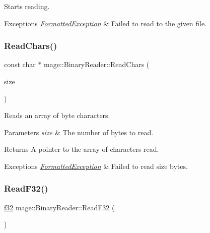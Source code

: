 Starts reading.


\begin{DoxyExceptions}{Exceptions}
{\em \hyperlink{structmage_1_1_formatted_exception}{Formatted\+Exception}} & Failed to read to the given file. \\
\hline
\end{DoxyExceptions}
\hypertarget{classmage_1_1_binary_reader_af1e0e4ab815e23c72ab65fd7c0748d3f}{}\label{classmage_1_1_binary_reader_af1e0e4ab815e23c72ab65fd7c0748d3f} 
\subsubsection{\texorpdfstring{Read\+Chars()}{ReadChars()}}
{\footnotesize\ttfamily const char $\ast$ mage\+::\+Binary\+Reader\+::\+Read\+Chars (\begin{DoxyParamCaption}\item[{size\+\_\+t}]{size }\end{DoxyParamCaption})\hspace{0.3cm}{\ttfamily [protected]}}

Reads an array of byte characters.


\begin{DoxyParams}{Parameters}
{\em size} & The number of bytes to read. \\
\hline
\end{DoxyParams}
\begin{DoxyReturn}{Returns}
A pointer to the array of characters read. 
\end{DoxyReturn}

\begin{DoxyExceptions}{Exceptions}
{\em \hyperlink{structmage_1_1_formatted_exception}{Formatted\+Exception}} & Failed to read {\ttfamily size} bytes. \\
\hline
\end{DoxyExceptions}
\hypertarget{classmage_1_1_binary_reader_a4edbec13821d82c471e8c155b1710f79}{}\label{classmage_1_1_binary_reader_a4edbec13821d82c471e8c155b1710f79} 
\subsubsection{\texorpdfstring{Read\+F32()}{ReadF32()}}
{\footnotesize\ttfamily \hyperlink{namespacemage_a6a44ad388483959dc4dff9f2aef91431}{f32} mage\+::\+Binary\+Reader\+::\+Read\+F32 (\begin{DoxyParamCaption}{ }\end{DoxyParamCaption})\hspace{0.3cm}{\ttfamily [protected]}}

